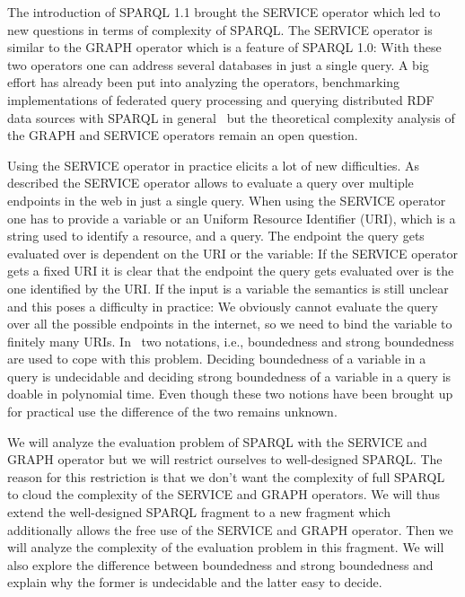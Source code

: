 The introduction of SPARQL 1.1 brought the SERVICE operator which
led to new questions in terms of complexity of SPARQL. The SERVICE operator is
similar to the GRAPH operator which is a feature of SPARQL 1.0: With these
two operators one can address several databases in just a single query. A big
effort has already been put into analyzing the operators, benchmarking
implementations of federated query processing
and querying distributed RDF data sources with SPARQL in
general~\cite{BuilAranda20131,schwarte2011fedx,quilitz2008querying,
buil2014towards,montoya2015federated} but the theoretical complexity 
analysis of the GRAPH and SERVICE operators remain an open question.

Using the SERVICE operator in practice elicits a lot of new difficulties.
As described the SERVICE operator allows to evaluate a query over multiple
endpoints in the web in just a single query. When using the SERVICE operator one
has to provide a variable or an Uniform Resource Identifier (URI), which is a
string used to identify a resource,  and a query. The endpoint the query gets
evaluated over is dependent on the URI  or the variable: If the SERVICE operator
gets  a fixed URI it is clear that the endpoint the query gets evaluated over is the one
identified by the URI. If the input is a variable the semantics is still 
unclear and this poses a difficulty in practice: We obviously cannot evaluate the query over all the possible
endpoints in the internet, so we need to bind the variable to finitely many
URIs. In~\cite{BuilAranda20131} two notations, i.e.,
boundedness and strong boundedness are used to cope with this problem.
Deciding boundedness of a variable in a query is undecidable and deciding strong
boundedness of a variable in a query is doable in polynomial time. Even though
these two notions have been brought up for practical use the difference of the two remains
unknown.

We will analyze the evaluation problem of SPARQL with the SERVICE and GRAPH
operator but we will restrict ourselves to well-designed SPARQL. The reason for
this restriction is that we don't want the complexity of full SPARQL to cloud
the complexity of the SERVICE and GRAPH operators. We will thus extend the
well-designed SPARQL fragment to a new fragment which additionally allows the
free use of the SERVICE and GRAPH operator. Then we will analyze the complexity
of the evaluation problem in this fragment. We will also explore the difference between
boundedness and strong boundedness and explain why the former is undecidable and
the latter easy to decide.  

